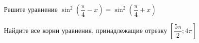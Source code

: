 \begin{ex}
	\begin{condition}
		\begin{enumcols}[label=\asbuk*)]
			\item Решите уравнение \( \sin^2\left( \dfrac{\pi}{4} - x \right)=\sin^2\left( \dfrac{\pi}{4} + x \right) \)
			\item Найдите все корни уравнения, принадлежащие отрезку \( \left[ \dfrac{5\pi}{2};4\pi \right] \)
		\end{enumcols}
	\end{condition}
\end{ex}